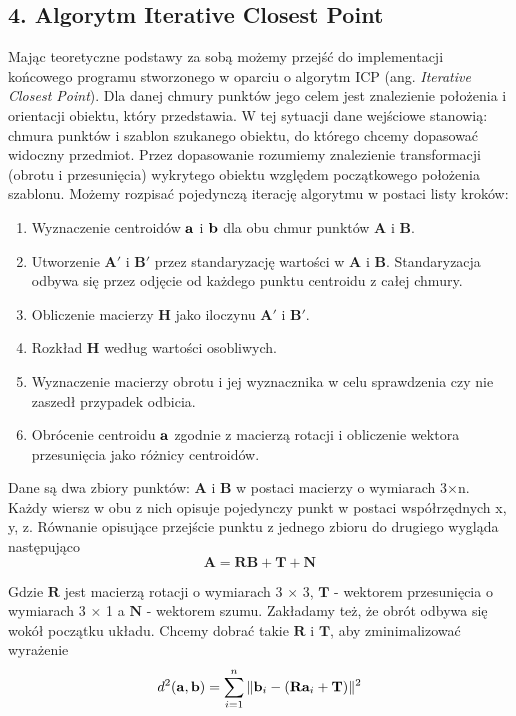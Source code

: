 \documentclass{article}
\begin{document}
\subsection*{\LARGE{4. Algorytm Iterative Closest Point}} 

Mając teoretyczne podstawy za sobą możemy przejść do implementacji końcowego programu stworzonego w oparciu o algorytm ICP (ang. \emph{Iterative Closest Point}). Dla danej chmury punktów jego celem jest znalezienie położenia i orientacji obiektu, który przedstawia. W tej sytuacji dane wejściowe stanowią: chmura punktów i szablon szukanego obiektu, do którego chcemy dopasować widoczny przedmiot. Przez dopasowanie rozumiemy znalezienie transformacji (obrotu i przesunięcia) wykrytego obiektu względem początkowego położenia szablonu. Możemy rozpisać pojedynczą iterację algorytmu w postaci listy kroków:

\begin{enumerate}
\item Wyznaczenie centroidów $\vb{a}$ i $\vb{b}$ dla obu chmur punktów $\mathbf{A}$ i $\mathbf{B}$.
\item Utworzenie $\mathbf{A'}$ i $\mathbf{B'}$ przez standaryzację wartości w $\mathbf{A}$ i $\mathbf{B}$. Standaryzacja odbywa się przez odjęcie od każdego punktu centroidu z całej chmury.
\item Obliczenie macierzy $\mathbf{H}$ jako iloczynu $\mathbf{A'}$ i $\mathbf{B'}$.
\item Rozkład $\mathbf{H}$ według wartości osobliwych.
\item Wyznaczenie macierzy obrotu i jej wyznacznika w celu sprawdzenia czy nie zaszedł przypadek odbicia.
\item Obrócenie centroidu $\vb{a}$ zgodnie z macierzą rotacji i obliczenie wektora przesunięcia jako różnicy centroidów. 
\end{enumerate}

Dane są dwa zbiory punktów: $\mathbf{A}$ i $\mathbf{B}$ w postaci macierzy o wymiarach 3$\times$n. Każdy wiersz w obu z nich opisuje pojedynczy punkt w postaci współrzędnych x, y, z. Równanie opisujące przejście punktu z jednego zbioru do drugiego wygląda następująco
\[\mathbf{A = R B + T + N} \]

Gdzie $\mathbf{R}$ jest macierzą rotacji o wymiarach 3 $\times$ 3, $\mathbf{T}$ - wektorem przesunięcia o wymiarach 3 $\times$ 1 a $\mathbf{N}$ - wektorem szumu. Zakładamy też, że obrót odbywa się wokół początku układu. Chcemy dobrać takie $\mathbf{R}$ i $\mathbf{T}$, aby zminimalizować wyrażenie
\[d^2(\vb{a}, \vb{b}) = \sum_{i=1}^n \| \vb{b}_{i} - (\mathbf{R} \vb{a}_i + \mathbf{T})\|^2 \]
\end{document}
